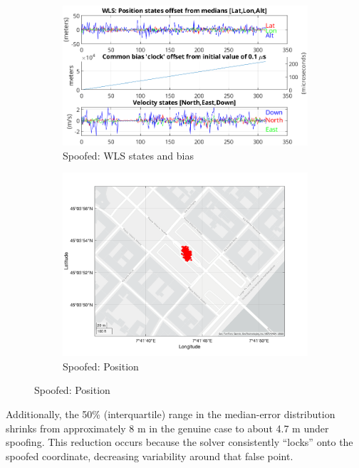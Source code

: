         \begin{figure}[h!]
            \centering
            \begin{subfigure}{0.23\textwidth}
                \includegraphics[width=\textwidth]{images/tests/Monte_Cappuccini/Spoofing/task5_figures/Samsung_A51_Monte_Cappuccini_fig5.png}
                \caption{Spoofed: WLS states and bias}
            \end{subfigure}
            \hfill
            \begin{subfigure}{0.23\textwidth}
                \includegraphics[width=\textwidth]{images/tests/Monte_Cappuccini/Spoofing/task5_figures/Samsung_A51_Monte_Cappuccini_fig6.png}
                \caption{Spoofed: Position}
            \end{subfigure}
        \end{figure}

        
        \noindent Additionally, the 50\% (interquartile) range in the median-error distribution shrinks from approximately 8 m in the genuine case to about 4.7 m under spoofing. 
        This reduction occurs because the solver consistently “locks” onto the spoofed coordinate, decreasing variability around that false point.

